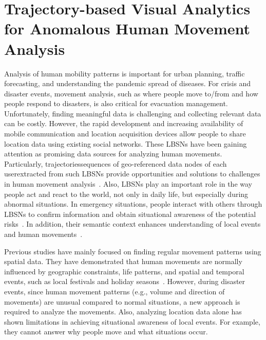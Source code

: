 \chapter{Trajectory-based Visual Analytics for Anomalous Human Movement Analysis}

Analysis of human mobility patterns is important for urban planning, traffic forecasting, and understanding the pandemic spread of diseases.
For crisis and disaster events, movement analysis, such as where people move to/from and how people respond to disasters, is also critical for evacuation management.
Unfortunately, finding meaningful data is challenging and collecting relevant data can be costly.
However, the rapid development and increasing availability of mobile communication and location acquisition devices allow people to share location data using existing social networks.
These LBSNs have been gaining attention as promising data sources for analyzing human movements.
Particularly, trajectories\textemdash sequences of geo-referenced data nodes of each user\textemdash extracted from such LBSNs provide opportunities and solutions to challenges in human movement analysis~\cite{Andrienko:2009:Analysis, Fuchs:2013:Extracting, Gabrielli:2014:Tweets}.
Also, LBSNs play an important role in the way people act and react to the world, not only in daily life, but especially during abnormal situations.
In emergency situations, people interact with others through LBSNs to confirm information and obtain situational awareness of the potential risks~\cite{national:2013:Public}.
In addition, their semantic context enhances understanding of local events and human movements~\cite{Hochman:2012:Visualizing, Zin:2013:Knowledge}.

Previous studies have mainly focused on finding regular movement patterns using spatial data.
They have demonstrated that human movements are normally influenced by geographic constraints, life patterns, and spatial and temporal events, such as local festivals and holiday seasons~\cite{Andrienko:2011:Movement, Fujisaka:2010:DOU}.
However, during disaster events, since human movement patterns (e.g., volume and direction of movements) are unusual compared to normal situations, a new approach is required to analyze the movements.
Also, analyzing location data alone has shown limitations in achieving situational awareness of local events.
For example, they cannot answer why people move and what situations occur.

